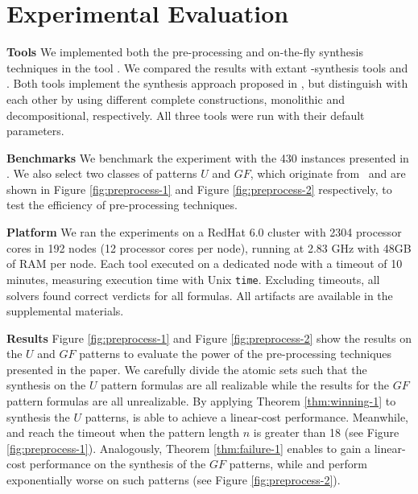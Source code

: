 
\section {Experimental Evaluation}\label {sec:exp}

\noindent\textbf{Tools} We implemented both the pre-processing and on-the-fly synthesis techniques in the tool \toolname. We compared the results with extant \ltlf-synthesis tools \syft \cite{ZTLPV17} and \lisasyft \cite{BLTV20}. Both tools implement the synthesis approach proposed in \cite{GV15}, but distinguish with each other by using different complete \dfa constructions, monolithic and decompositional, respectively. All three tools were run with their default parameters. 

\noindent\textbf{Benchmarks}  We benchmark the experiment with the 430 instances presented in \cite{BLTV20}. We also select two classes of patterns $U$ and $GF$, which originate from~\cite{RV07} and are shown in Figure \ref{fig:preprocess-1} and Figure \ref{fig:preprocess-2} respectively, to test the efficiency of pre-processing techniques.

\noindent\textbf{Platform} We ran the experiments on a RedHat 6.0 cluster with 2304 processor cores
in 192 nodes (12 processor cores per node), running at 2.83 GHz with 48GB of
RAM per node. 
Each tool executed on a dedicated node with a timeout of 10 minutes, measuring execution time with Unix \texttt{time}. Excluding timeouts, all solvers found correct verdicts for all formulas. All artifacts are available in the supplemental materials.




\noindent\textbf{Results} Figure \ref{fig:preprocess-1} and Figure \ref{fig:preprocess-2} show the results on the $U$ and $GF$ patterns to evaluate the power of the pre-processing techniques presented in the paper. We carefully divide the atomic sets such that the synthesis on the $U$ pattern formulas are all realizable while the results for the $GF$ pattern formulas are all unrealizable. By applying Theorem \ref{thm:winning-1} to synthesis the $U$ patterns, \toolname is able to achieve a linear-cost performance. Meanwhile, \syft and \lisasyft reach the timeout when the pattern length $n$ is greater than 18 (see Figure \ref{fig:preprocess-1}). Analogously, Theorem \ref{thm:failure-1} enables \toolname to gain a linear-cost performance on the synthesis of the $GF$ patterns, while \syft and \lisasyft perform exponentially worse on such patterns (see Figure \ref{fig:preprocess-2}). 

